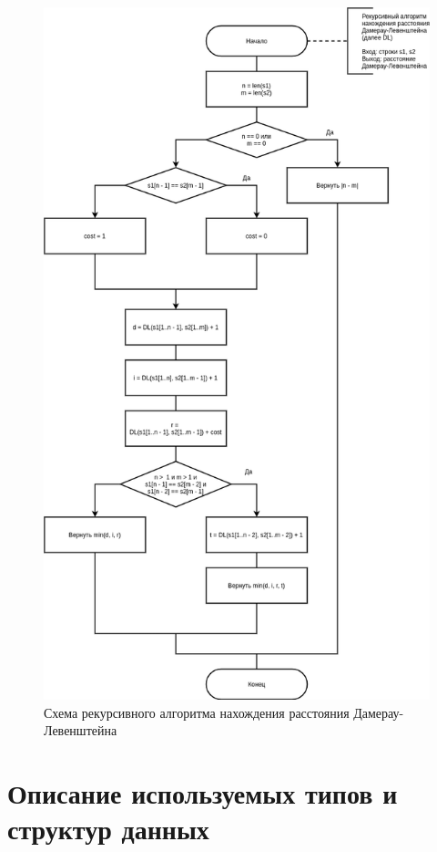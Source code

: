 \begin{figure}[H]
	\begin{center}
		\includegraphics[scale=0.5]{img/dl.png}
	\end{center}
	\captionsetup{justification=centering}
	\caption{Схема рекурсивного алгоритма нахождения расстояния Дамерау-Левенштейна}
	\label{img:dl}
\end{figure}

\section{Описание используемых типов и структур данных}

